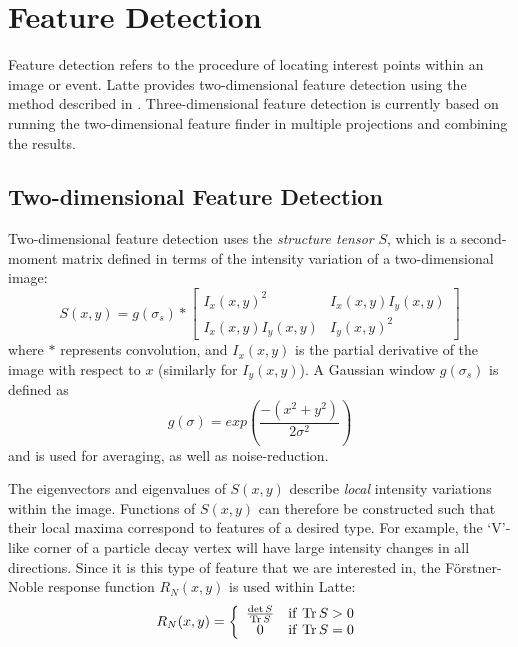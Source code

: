 \section{Feature Detection}\label{sec:latte_feature_detection}
Feature detection refers to the procedure of locating interest points within an image or event. Latte provides two-dimensional feature detection using the method described in \citep{Morgan2010}. Three-dimensional feature detection is currently based on running the two-dimensional feature finder in multiple projections and combining the results.

\subsection{Two-dimensional Feature Detection}
Two-dimensional feature detection uses the \emph{structure tensor} $S$, which is a second-moment matrix defined in terms of the intensity variation of a two-dimensional image:~\citep{Morgan2010}
\begin{equation}\label{eqn:structure_tensor}
    S(x,y) = g(\sigma_s) \ast \left[ \begin{array}{cc} I_x(x,y)^2 & I_x(x,y)I_y(x,y) \\ I_x(x,y)I_y(x,y) & I_y(x,y)^2 \end{array} \right]
\end{equation}
where $\ast$ represents convolution, and $I_x(x,y)$ is the partial derivative of the image with respect to $x$ (similarly for $I_y(x,y)$). A Gaussian window $g(\sigma_s)$ is defined as
\begin{equation}\label{eqn:feature_det_gaussian_window}
    g(\sigma) = exp\left( \frac{-(x^2 + y^2)}{2\sigma^2} \right)
\end{equation}
and is used for averaging, as well as noise-reduction.

The eigenvectors and eigenvalues of $S(x,y)$ describe \emph{local} intensity variations within the image. Functions of $S(x,y)$ can therefore be constructed such that their local maxima correspond to features of a desired type. For example, the `V'-like corner of a particle decay vertex will have large intensity changes in all directions. Since it is this type of feature that we are interested in, the F\"orstner-Noble response function $R_N(x,y)$ is used within Latte:
\begin{equation}\label{eqn:forstner-noble}
    R_N(x,y) = \left\{ \begin{array}{cl} \frac{\det S}{\mathrm{Tr}\, S} & \mathrm{if~} \mathrm{Tr}\, S > 0 \\ 0 & \mathrm{if~} \mathrm{Tr}\, S = 0 \end{array} \right.
\end{equation}

